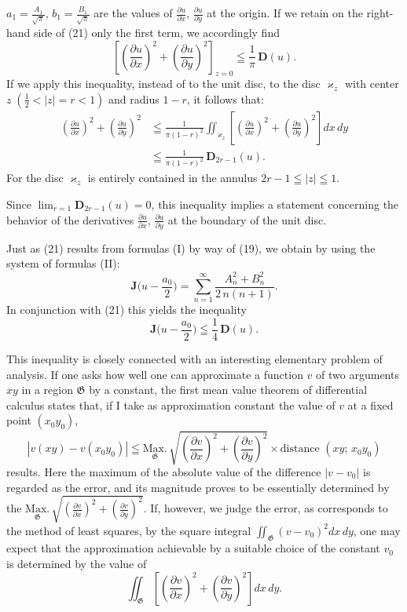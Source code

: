 \documentclass{article}
\begin{document}
$a_1 = \frac{A_1}{\sqrt{\pi}}$, $b_1 = \frac{B_1}{\sqrt{\pi}}$ are the values of $\frac{\partial u}{\partial x}$, $\frac{\partial u}{\partial y}$ at the origin. If we retain on the right-hand side of (21) only the first term, we accordingly find
\[ \left[ \left(\frac{\partial u}{\partial x}\right)^2 + \left(\frac{\partial u}{\partial y}\right)^2 \right]_{z=0} \leqq \frac{1}{\pi}\,\mathbf{D}(u). \tag{22} \]
If we apply this inequality, instead of to the unit disc, to the disc $\varkappa_z$ with center $z\;(\frac{1}{2} < |z| = r < 1)$ and radius $1 - r$, it follows that:
\[ \begin{aligned}
\left(\frac{\partial u}{\partial x}\right)^2 + \left(\frac{\partial u}{\partial y}\right)^2 &\leqq \frac{1}{\pi(1 - r)^2} \iint_{\varkappa_z} \left[ \left(\frac{\partial u}{\partial x}\right)^2 + \left(\frac{\partial u}{\partial y}\right)^2 \right] dx\,dy \\
&\leqq \frac{1}{\pi(1 - r)^2}\,\mathbf{D}_{2r-1}(u). \tag{23}
\end{aligned} \]
For the disc $\varkappa_z$ is entirely contained in the annulus $2r - 1 \leqq |z| \leqq 1$.

Since $\lim_{r=1} \mathbf{D}_{2r-1}(u) = 0$, this inequality implies a statement concerning the behavior of the derivatives $\frac{\partial u}{\partial x}$, $\frac{\partial u}{\partial y}$ at the boundary of the unit disc.

Just as (21) results from formulas (I) by way of (19), we obtain by using the system of formulas (II):
\[ \mathbf{J}\Big( u - \frac{a_0}{2} \Big) = \sum_{n=1}^\infty \frac{A_n^2 + B_n^2}{2\,n(n+1)}. \]
In conjunction with (21) this yields the inequality
\[ \mathbf{J}\Big( u - \frac{a_0}{2} \Big) \leqq \frac{1}{4}\,\mathbf{D}(u). \tag{24} \]

This inequality is closely connected with an interesting elementary problem of analysis. If one asks how well one can approximate a function $v$ of two arguments $xy$ in a region $\mathfrak{G}$ by a constant, the first mean value theorem of differential calculus states that, if I take as approximation constant the value of $v$ at a fixed point $(x_0 y_0)$,
\[ | v(xy) - v(x_0 y_0) | \leqq \underset{\mathfrak{G}}{\mathrm{Max.}}\, \sqrt{\left(\frac{\partial v}{\partial x}\right)^2 + \left(\frac{\partial v}{\partial y}\right)^2} \times \text{distance } (xy;\,x_0 y_0) \]
results. Here the maximum of the absolute value of the difference $|v - v_0|$ is regarded as the error, and its magnitude proves to be essentially determined by the $\underset{\mathfrak{G}}{\mathrm{Max.}}\,\sqrt{\left(\frac{\partial v}{\partial x}\right)^2 + \left(\frac{\partial v}{\partial y}\right)^2}$. If, however, we judge the error, as corresponds to the method of least squares, by the square integral $\displaystyle\iint_{\mathfrak{G}} (v - v_0)^2 dx\,dy$, one may expect that the approximation achievable by a suitable choice of the constant $v_0$ is determined by the value of
\[ \iint_{\mathfrak{G}} \left[ \left(\frac{\partial v}{\partial x}\right)^2 + \left(\frac{\partial v}{\partial y}\right)^2 \right] dx\,dy. \]
\end{document}
